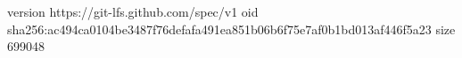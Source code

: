 version https://git-lfs.github.com/spec/v1
oid sha256:ac494ca0104be3487f76defafa491ea851b06b6f75e7af0b1bd013af446f5a23
size 699048

